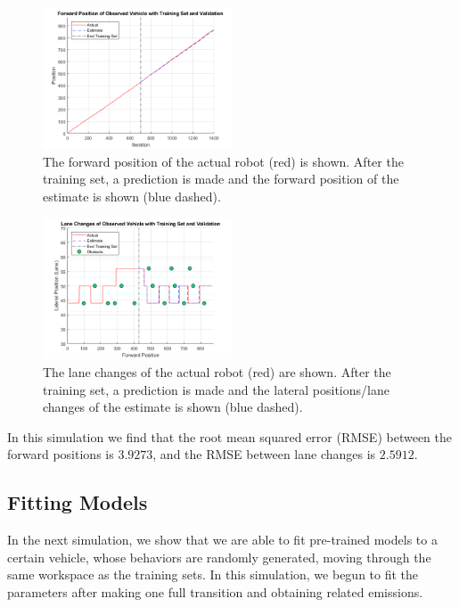 \documentclass[letterpaper, 10 pt, conference]{ieeeconf}  %
\begin{document}
\begin{figure}[ht]
    \includegraphics[width=0.5\textwidth]{train1.png}
    \caption{The forward position of the actual robot (red) is shown. After the training set, a prediction is made and the forward position of the estimate is shown (blue dashed).}
    \label{fig:train1}
\end{figure}

\begin{figure}[ht]
    \includegraphics[width=0.5\textwidth]{train2.png}
    \caption{The lane changes of the actual robot (red) are shown. After the training set, a prediction is made and the lateral positions/lane changes of the estimate is shown (blue dashed).}
    \label{fig:train2}
\end{figure}

In this simulation we find that the root mean squared error (RMSE) between the forward positions is $3.9273$, and the RMSE between lane changes is $2.5912$.  

\subsection{Fitting Models}

In the next simulation, we show that we are able to fit pre-trained models to a certain vehicle, whose behaviors are randomly generated, moving through the same workspace as the training sets. In this simulation, we begun to fit the parameters after making one full transition and obtaining related emissions. 
\end{document}
